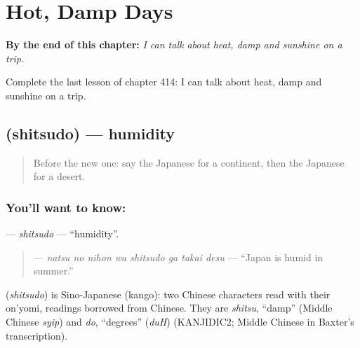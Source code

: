 
\chapter{Hot, Damp Days}
\label{ch:ja-hot-damp-days}

\begin{chapteropening}
\textbf{By the end of this chapter:} \emph{I can talk about heat, damp and sunshine on a trip.}

Complete the last lesson of chapter 414: I can talk about heat, damp and sunshine on a trip.
\end{chapteropening}

\section[\texorpdfstring{\ja{しつど} (shitsudo)}{しつど (shitsudo)}]{ (shitsudo) — humidity}

\label{lesson:JA-C414-shitsudo}



\begin{quote}
Before the new one: say the Japanese for a continent, then the Japanese for a desert.
\end{quote}

\subsection*{You'll want to know: }
\textbf{} — \emph{shitsudo} — \textquotedblleft{}humidity\textquotedblright{}.

\begin{quote}
\textbf{   } — \emph{natsu no nihon wa shitsudo ga takai desu} — \textquotedblleft{}Japan is humid in summer.\textquotedblright{}
\end{quote}

\begin{cousinweb}
\textbf{} (\emph{shitsudo}) is Sino-Japanese (kango): two Chinese characters read with their on'yomi, readings borrowed from Chinese. They are \emph{shitsu}, \textquotedblleft{}damp\textquotedblright{} (Middle Chinese \emph{syip}) and \emph{do}, \textquotedblleft{}degrees\textquotedblright{} (\emph{duH}) (KANJIDIC2; Middle Chinese in Baxter's transcription).
\end{cousinweb}

